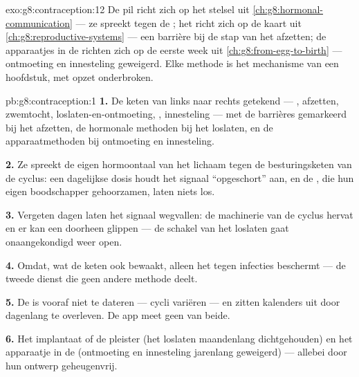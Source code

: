 \begin{solution}{exo:g8:contraception:12}
De pil richt zich op het stelsel uit
\cref{ch:g8:hormonal-communication} --- ze spreekt  tegen de
; het  richt zich op de kaart uit
\cref{ch:g8:reproductive-systems} --- een barrière bij de stap van het
afzetten; de apparaatjes in de  richten zich op de eerste week
uit \cref{ch:g8:from-egg-to-birth} --- ontmoeting en innesteling geweigerd.
Elke methode is het mechanisme van een hoofdstuk, met opzet onderbroken.
\end{solution}

\begin{solution}{pb:g8:contraception:1}
\textbf{1.} De keten van links naar rechts getekend --- , afzetten,
zwemtocht, loslaten-en-ontmoeting, , innesteling --- met de
barrières gemarkeerd bij het afzetten, de hormonale methoden bij het
loslaten, en de apparaatmethoden bij ontmoeting en innesteling.

\textbf{2.} Ze spreekt de eigen hormoontaal van het lichaam tegen de
besturingsketen van de cyclus: een dagelijkse dosis houdt het signaal
``opgeschort'' aan, en de , die hun eigen boodschapper
gehoorzamen, laten niets los.

\textbf{3.} Vergeten dagen laten het signaal wegvallen: de machinerie van
de cyclus hervat en er kan een  doorheen glippen --- de schakel
van het loslaten gaat onaangekondigd weer open.

\textbf{4.} Omdat, wat de keten ook bewaakt, alleen het  tegen
infecties beschermt --- de tweede dienst die geen andere methode deelt.

\textbf{5.} De  is vooraf niet te dateren --- cycli variëren --- en
 zitten kalenders uit door dagenlang te overleven. De app meet
geen van beide.

\textbf{6.} Het implantaat of de pleister (het loslaten maandenlang
dichtgehouden) en het apparaatje in de  (ontmoeting en
innesteling jarenlang geweigerd) --- allebei door hun ontwerp geheugenvrij.


\end{solution}
